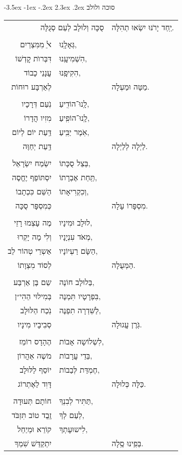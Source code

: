 \documentclass[12pt,letterpaper]{siddur}
\makeatletter
\renewcommand\section{\setcounter{mishnah}{0}\@startsection {section}{1}{\z@}%
                                   {-3.5ex \@plus -1ex \@minus -.2ex}%
                                   {2.3ex \@plus.2ex}%
                                   {\normalfont\large}}
\makeatother
\begin{document}
\section{סוכה ולולב}
\begin{longtable}[r]{r l l}\multicolumn{2}{r}{
סֻכָּה וְלוּלָב לְעַם סְגֻלָּה}&
יַֽחַד יָרֹנּוּ יִשְׂאוּ תְהִלָּה.\\\\
ﭏֵ מִמִּצְרַיִם&גְּאָלָֽנוּ,\\
דִּבְּרוֺת קׇדְשׁוֹ&הִשְׁמִיעָֽנוּ,\\
עֲנָנֵי כָבוֹד&הִקִיפָֽנוּ,\\
לְאַרְבָּע רוּחוֹת&&מַטָּה וּמַעְלָה.\\\\
נֹֽעַם דְּרָכָיו&לָֽנוּ־הוֹדִֽיעַ,\\
מִזִיו הֲדָרוֹ&לָֽנוּ־הוֹפִֽיעַ,\\
דַּֽעַת יוֹם לְיוֹם&אֹֽמֶר יַבִּֽיעַ,\\
דַּֽעַת יְחַוֶּה&&לַיְלָה לְלַיְלָה.\\\\
יִשְׂמַח יִשְׂרָאֵל&בְּצֵל סֻכָּתוֹ,\\
יִסְתּוֹפֵף יֶחֱסֶה&תַּֽחַת אֶבְרָתוֹ,\\
הַשֵּׁם כִּכְתָבוֹ&וְכִקְרִיאָתוֹ,\\
כְּמִסְפָּר סֻכָּה&&מִסְפָּרוֹ עָלָה.\\\\
מֶה עָצְמוּ רָזֵי&לוּלָב וּמִינָיו,\\
וְלִי מָה יָקְרוּ&מְאֹד עִנְיָנָיו,\\
אַשְרֵי טְהוֹר לֵב&הַשָּׂם רַעְיוֹנָיו,\\
לְסוֹד מִצְוָתוֹ&&הַמְּעֻלָה.\\\\
שֵם בֶּן אַרְבַּע&בַּלוּלָב חוֹנֶה,\\
בְּמִילוּי הֵהִי״ן&בִּפְרָטָיו תִּמְנֶה,\\
נֹֽכַח הַלּוּלָב&לַשִּׁדְרָה תִפְנֶה,\\
סְבִיבָיו מִינָיו&&גֹּֽרֶן עֲגוּלָה.\\\\
הֶהָדָס רוֹמֵז&לִשְלוֹשָה אָבוֹת,\\
מֹשֶה אַהֲרוֹן&בַּדֵי עֲרָבוֹת,\\
יוֹסֵף לַלּוּלָב&חֶמְדַּת לְּבַבוֹת,\\
דָּוִד לַאֶתְרוֹג&&כַּלָּה כְּלוּלָה.\\\\
חוֹתָם תְּעוּדָה&תַּתִּיר לְבִנְךָ,\\
זֶֽבֶד טוֹב תִּזְבֹּד&לְעַם לְךָ,\\
קוֹרֵא וּמְיַחֵל&לִישוּעָתְךָ,\\
יִתְקַדַּשׁ שִׁמְךָ&&בְּפִֽינוּ סֶֽלָה.
\end{longtable}
\end{document}
